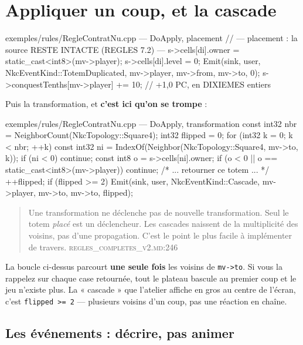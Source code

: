 \section{Appliquer un coup, et la cascade}

\begin{nkcode}{exemples/rules/RegleContratNu.cpp — DoApply, placement}
// --- placement : la source RESTE INTACTE (REGLES 7.2) ---
s->cells[di].owner = static_cast<int8>(mv->player);
s->cells[di].level = 0;
Emit(sink, user, NkcEventKind::TotemDuplicated, mv->player, mv->from, mv->to, 0);
s->conquestTenths[mv->player] += 10;   // +1,0 PC, en DIXIEMES entiers
\end{nkcode}

Puis la transformation, et \textbf{c'est ici qu'on se trompe} :

\begin{nkcode}{exemples/rules/RegleContratNu.cpp — DoApply, transformation}
const int32 nbr     = NeighborCount(NkcTopology::Square4);
int32       flipped = 0;
for (int32 k = 0; k < nbr; ++k) {
    const int32 ni = IndexOf(Neighbor(NkcTopology::Square4, mv->to, k));
    if (ni < 0) continue;
    const int8 o = s->cells[ni].owner;
    if (o < 0 || o == static_cast<int8>(mv->player)) continue;
    /* ... retourner ce totem ... */
    ++flipped;
}
if (flipped >= 2)
    Emit(sink, user, NkcEventKind::Cascade, mv->player, mv->to, mv->to, flipped);
\end{nkcode}

\begin{nkpiege}
\begin{quote}\small
Une transformation ne déclenche pas de nouvelle transformation. Seul le totem
\emph{placé} est un déclencheur. Les cascades naissent de la multiplicité des
voisins, pas d'une propagation. C'est le point le plus facile à implémenter de
travers.
\hfill\textsc{regles\_completes\_v2.md:246}
\end{quote}

La boucle ci-dessus parcourt \textbf{une seule fois} les voisins de
\texttt{mv->to}. Si vous la rappelez sur chaque case retournée, tout le plateau
bascule au premier coup et le jeu n'existe plus. La « cascade » que l'atelier
affiche en gros au centre de l'écran, c'est \texttt{flipped >= 2} — plusieurs
voisins d'un coup, pas une réaction en chaîne.
\end{nkpiege}

\subsection{Les événements : décrire, pas animer}

